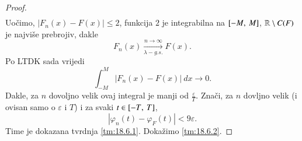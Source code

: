 \begin{proof}
\begin{equation*}
\begin{aligned}
        \end{aligned}
    \end{equation*}
    Uo\v cimo, $|F_n (x) - F (x)| \leq 2$, funkcija $2$ je integrabilna na $[{-M}, \:{M}]$, $\mathbb{R} \setminus C(F)$ je najvi\v se prebrojiv, dakle
    \begin{equation*}
        F_n (x) \xrightarrow[\lambda-g.s.]{n \to \infty} F(x).
    \end{equation*}
    Po LTDK sada vrijedi
    \begin{equation*}
        \int_{-M}^M |F_n (x) - F(x)| \: d x \to 0.
    \end{equation*}
    Dakle, za $n$ dovoljno velik ovaj integral je manji od $\frac{\varepsilon}{T}$.
    Zna\v ci, za $n$ dovljno velik (i ovisan samo o $\varepsilon$ i $T$) i za svaki $t \in [{-T}, \:{T}]$,
    \begin{equation*}
        |\varphi_n (t) - \varphi_F (t)| < 9 \varepsilon.
    \end{equation*}
    Time je dokazana tvrdnja \ref{tm:18.6.1}.
    Doka\v zimo \ref{tm:18.6.2}.


\end{proof}
